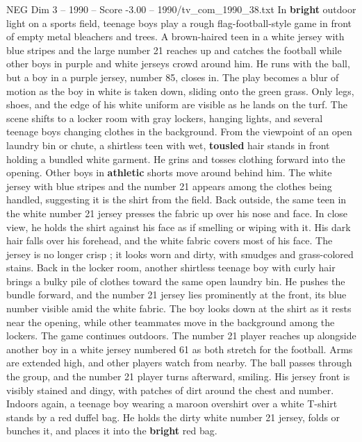 \begin{textsample}{NEG Dim 3 – 1990 – Score -3.00 – 1990/tv\_com\_1990\_38.txt}  \label{ex:f3_neg_043}
In \textbf{bright} outdoor light on a sports field, teenage boys play a rough flag-football-style game in front of empty metal bleachers and trees.
A brown-haired teen in a white jersey with blue stripes and the large number 21 reaches up and catches the football while other boys in purple and white jerseys crowd around him.
He runs with the ball, but a boy in a purple jersey, number 85, closes in.
The play becomes a blur of motion as the boy in white is taken down, sliding onto the green grass.
Only legs, shoes, and the edge of his white uniform are visible as he lands on the turf.
The scene shifts to a locker room with gray lockers, hanging lights, and several teenage boys changing clothes in the background.
From the viewpoint of an open laundry bin or chute, a shirtless teen with wet, \textbf{tousled} hair stands in front holding a bundled white garment.
He grins and tosses clothing forward into the opening.
Other boys in \textbf{athletic} shorts move around behind him.
The white jersey with blue stripes and the number 21 appears among the clothes being handled, suggesting it is the shirt from the field.
Back outside, the same teen in the white number 21 jersey presses the fabric up over his nose and face.
In close view, he holds the shirt against his face as if smelling or wiping with it.
His dark hair falls over his forehead, and the white fabric covers most of his face.
The jersey is no longer crisp ; it looks worn and dirty, with smudges and grass-colored stains.
Back in the locker room, another shirtless teenage boy with curly hair brings a bulky pile of clothes toward the same open laundry bin.
He pushes the bundle forward, and the number 21 jersey lies prominently at the front, its blue number visible amid the white fabric.
The boy looks down at the shirt as it rests near the opening, while other teammates move in the background among the lockers.
The game continues outdoors.
The number 21 player reaches up alongside another boy in a white jersey numbered 61 as both stretch for the football.
Arms are extended high, and other players watch from nearby.
The ball passes through the group, and the number 21 player turns afterward, smiling.
His jersey front is visibly stained and dingy, with patches of dirt around the chest and number.
Indoors again, a teenage boy wearing a maroon overshirt over a white T-shirt stands by a red duffel bag.
He holds the dirty white number 21 jersey, folds or bunches it, and places it into the \textbf{bright} red bag.

\end{textsample}
